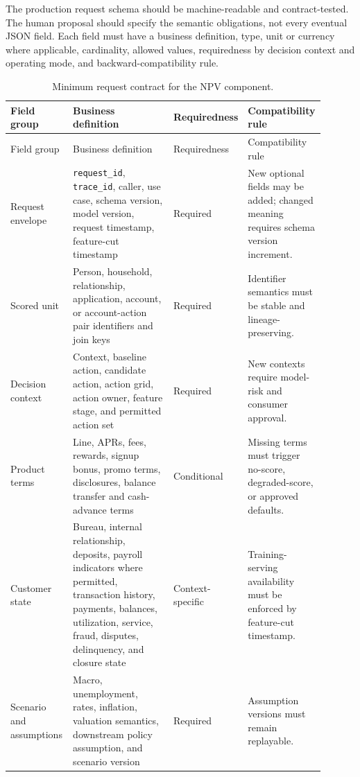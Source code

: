 \documentclass[11pt]{article}
\newcommand{\1}{\mathbf{1}}
\newcommand{\code}[1]{\nolinkurl{#1}}
\begin{document}
The production request schema should be machine-readable and contract-tested.
The human proposal should specify the semantic obligations, not every eventual
JSON field. Each field must have a business definition, type, unit or currency
where applicable, cardinality, allowed values, requiredness by decision context
and operating mode, and backward-compatibility rule.

\begin{longtable}{L{0.20\linewidth}L{0.36\linewidth}L{0.14\linewidth}L{0.20\linewidth}}
\caption{Minimum request contract for the NPV component.}
\label{tab:request-contract}\\
\toprule
Field group & Business definition & Requiredness & Compatibility rule \\
\midrule
\endfirsthead
\toprule
Field group & Business definition & Requiredness & Compatibility rule \\
\midrule
\endhead
Request envelope
  & \code{request_id}, \code{trace_id}, caller, use case, schema version,
    model version, request timestamp, feature-cut timestamp
  & Required
  & New optional fields may be added; changed meaning requires schema version
    increment. \\
Scored unit
  & Person, household, relationship, application, account, or account-action
    pair identifiers and join keys
  & Required
  & Identifier semantics must be stable and lineage-preserving. \\
Decision context
  & Context, baseline action, candidate action, action grid, action owner,
    feature stage, and permitted action set
  & Required
  & New contexts require model-risk and consumer approval. \\
Product terms
  & Line, APRs, fees, rewards, signup bonus, promo terms, disclosures, balance
    transfer and cash-advance terms
  & Conditional
  & Missing terms must trigger no-score, degraded-score, or approved defaults. \\
Customer state
  & Bureau, internal relationship, deposits, payroll indicators where
    permitted, transaction history, payments, balances, utilization, service,
    fraud, disputes, delinquency, and closure state
  & Context-specific
  & Training-serving availability must be enforced by feature-cut timestamp. \\
Scenario and assumptions
  & Macro, unemployment, rates, inflation, valuation semantics, downstream
    policy assumption, and scenario version
  & Required
  & Assumption versions must remain replayable. \\
\bottomrule
\end{longtable}
\end{document}
